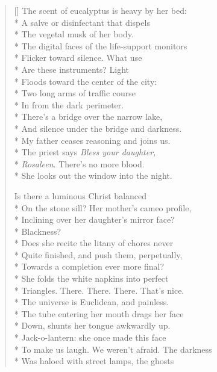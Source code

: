 \begin{verse}[\versewidth]
The scent of eucalyptus is heavy by her bed:\\*
A salve or disinfectant that dispels\\*
The vegetal musk of her body.\\*
The digital faces of the life-support monitors\\*
Flicker toward silence. What use\\*
Are these instruments? Light\\*
Floods toward the center of the city:\\*
Two long arms of traffic course\\*
In from the dark perimeter.\\*
There's a bridge over the narrow lake,\\*
And silence under the bridge and darkness.\\*
My father ceases reasoning and joins us.\\*
The priest says \textit{Bless your daughter,}\\*
\textit{Rosaleen}. There's no more blood.\\*
She looks out the window into the night.

Is there a luminous Christ balanced\\*
On the stone sill? Her mother's cameo profile,\\*
Inclining over her daughter's mirror face?\\*
Blackness?\\*
Does she recite the litany of chores never\\*
Quite finished, and push them, perpetually,\\*
Towards a completion ever more final?\\*
She folds the white napkins into perfect\\*
Triangles. There. There. There. That's nice.\\*
The universe is Euclidean, and painless.\\*
The tube entering her mouth drags her face\\*
Down, shunts her tongue awkwardly up.\\*
Jack-o-lantern: she once made this face\\*
To make us laugh. We weren't afraid. The darkness\\*
Was haloed with street lamps, the ghosts


\end{verse}
